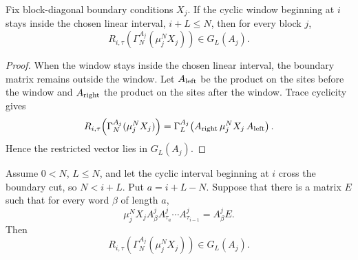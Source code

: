 \begin{lemma}
    \label{lem:block_diagonal_boundary_nonwrapping_component}
    \leanok
    Fix block-diagonal boundary conditions $X_j$. If the cyclic window beginning
    at $i$ stays inside the chosen linear interval, $i+L\le N$, then
    for every block $j$,
    \[
        R_{i,\tau}\!\left(\Gamma_N^{A_j}(\mu_j^NX_j)\right)
        \in G_L(A_j).
    \]
\end{lemma}

\begin{proof}
    \leanok
    When the window stays inside the chosen linear interval, the boundary matrix
    remains outside the window. Let $A_{\rm left}$ be the product on the sites
    before the window and $A_{\rm right}$ the product on the sites after the
    window. Trace cyclicity
    gives
    \[
        R_{i,\tau}\!\left(\Gamma_N^{A_j}(\mu_j^NX_j)\right)
        =
        \Gamma_L^{A_j}\!\left(A_{\rm right}\,\mu_j^NX_j\,A_{\rm left}\right).
    \]
    Hence the restricted vector lies in $G_L(A_j)$.
\end{proof}

\begin{lemma}
    \label{lem:block_diagonal_boundary_crossing_matrix_identity}
    \leanok
    Assume \(0<N\), \(L\le N\), and let the cyclic interval beginning at \(i\)
    cross the boundary cut, so \(N<i+L\). Put \(a=i+L-N\). Suppose that there is
    a matrix \(E\) such that for every word \(\beta\) of length \(a\),
    \[
        \mu_j^N X_j A^j_\beta
        A^j_{\tau_a}\cdots A^j_{\tau_{i-1}}
        =
        A^j_\beta E.
    \]
    Then
    \[
        R_{i,\tau}\!\left(\Gamma_N^{A_j}(\mu_j^NX_j)\right)
        \in G_L(A_j).
    \]
\end{lemma}


